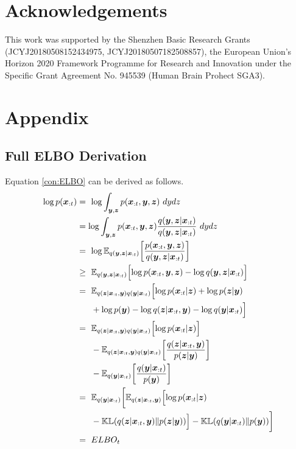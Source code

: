 \documentclass[letterpaper]{article} %
\begin{document}
\section{Acknowledgements}
This work was supported by the Shenzhen Basic Research Grants (JCYJ20180508152434975, JCYJ20180507182508857), the European Union's Horizon 2020 Framework Programme for Research and Innovation under the Specific Grant Agreement No. 945539 (Human Brain Prohect SGA3).


\clearpage

\appendix


\section{Appendix}
\subsection{Full ELBO Derivation}
\label{sec:elbo-derivation}

Equation \ref{con:ELBO} can be derived as follows.
\begin{equation}
\begin{aligned}
\log p(\bm x_{:t}) &=\ \log \int_{\bm y, \bm z} p(\bm x_{:t}, \bm y, \bm z)\ dy dz \\
&=  \log \int_{\bm y, \bm z} p(\bm x_{:t}, \bm y, \bm z) \frac{q(\bm y, \bm z|\bm x_{:t})}{q(\bm y, \bm z|\bm x_{:t})}\ dy dz \\
&=\ \log \mathbb{E}_{q(\bm y, \bm z|\bm x_{:t})} \biggl[\frac{p(\bm x_{:t}, \bm y, \bm z)}{q(\bm y, \bm z|\bm x_{:t})}\biggr] \\
&\geq\ \mathbb{E}_{q(\bm y, \bm z|\bm x_{:t})} \Bigl[\log p(\bm x_{:t}, \bm y, \bm z) - \log q(\bm y, \bm z|\bm x_{:t})\Bigr] \\
&=\ \mathbb{E}_{q(\bm z|\bm x_{:t}, \bm y) q(\bm y|\bm x_{:t})} \Bigl[\log p(\bm x_{:t}|\bm z) + \log p(\bm z|\bm y) \\ &\ \ \ \ \ + \log p(\bm y) - \log q(\bm z|\bm x_{:t}, \bm y) - \log q(\bm y|\bm x_{:t})\Bigr] \\
&=\ \mathbb{E}_{q(\bm z|\bm x_{:t}, \bm y) q(\bm y|\bm x_{:t})} \Bigl[\log p(\bm x_{:t}|\bm z)\Bigr] \\ & \ \ \ \ \ -\mathbb{E}_{q(\bm z|\bm x_{:t}, \bm y) q(\bm y|\bm x_{:t})} \biggl[\frac{q(\bm z|\bm x_{:t}, \bm y)}{p(\bm z|\bm y)}\biggr]  \\ & \ \ \ \ \  -\mathbb{E}_{q(\bm y|\bm x_{:t})} \biggl[\frac{q(\bm y|\bm x_{:t})}{p(\bm y)}\biggr] \\
&=\ \mathbb{E}_{q(\bm y|\bm x_{:t})} \biggl[ \mathbb{E}_{q(\bm z|\bm x_{:t}, \bm y)} \Bigl[\log p(\bm x_{:t}|\bm z)  \\ & \ \ \ \ \  -\mathbb{KL}(q(\bm z|\bm x_{:t}, \bm y)\| p(\bm z|\bm y))\Bigr] - \mathbb{KL}(q(\bm y|\bm x_{:t})\|p(\bm y))\biggr] \\
&=\ ELBO_{t}
\end{aligned}
\end{equation}  
\end{document}

